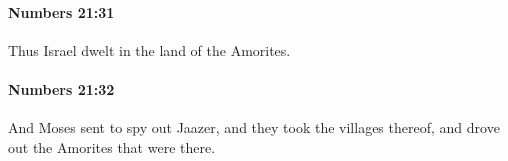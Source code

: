 		\paragraph{Numbers 21:31} %
			\label{NUMBERS-21-31}

			Thus Israel dwelt in the land of the Amorites.


		\paragraph{Numbers 21:32} %
			\label{NUMBERS-21-32}

			And Moses sent to spy out Jaazer, and they took the villages thereof, and drove out the Amorites that were there.


